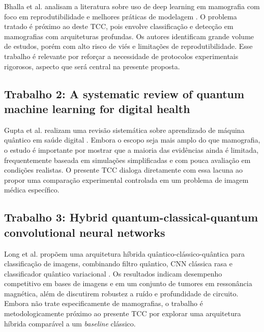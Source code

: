 \documentclass[
    12pt,
    openright,
    oneside,
    a4paper,
    english,
    brazil
]{abntex2}
\begin{document}
Bhalla et al. analisam a literatura sobre uso de deep learning em mamografia com foco em reprodutibilidade e melhores práticas de modelagem \cite{Bhalla2023MammographyReview}. O problema tratado é próximo ao deste TCC, pois envolve classificação e detecção em mamografias com arquiteturas profundas. Os autores identificam grande volume de estudos, porém com alto risco de viés e limitações de reprodutibilidade. Esse trabalho é relevante por reforçar a necessidade de protocolos experimentais rigorosos, aspecto que será central na presente proposta.

\subsection{Trabalho 2: A systematic review of quantum machine learning for digital health}

Gupta et al. realizam uma revisão sistemática sobre aprendizado de máquina quântico em saúde digital \cite{Gupta2025QMLDigitalHealth}. Embora o escopo seja mais amplo do que mamografia, o estudo é importante por mostrar que a maioria das evidências ainda é limitada, frequentemente baseada em simulações simplificadas e com pouca avaliação em condições realistas. O presente TCC dialoga diretamente com essa lacuna ao propor uma comparação experimental controlada em um problema de imagem médica específico.

\subsection{Trabalho 3: Hybrid quantum-classical-quantum convolutional neural networks}

Long et al. propõem uma arquitetura híbrida quântico-clássico-quântica para classificação de imagens, combinando filtro quântico, CNN clássica rasa e classificador quântico variacional \cite{Long2025QCQCNN}. Os resultados indicam desempenho competitivo em bases de imagens e em um conjunto de tumores em ressonância magnética, além de discutirem robustez a ruído e profundidade de circuito. Embora não trate especificamente de mamografias, o trabalho é metodologicamente próximo ao presente TCC por explorar uma arquitetura híbrida comparável a um \textit{baseline} clássico.
\end{document}
